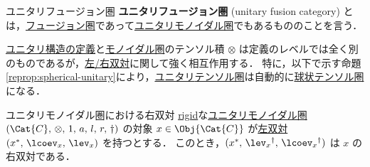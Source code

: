 \documentclass[TQFT_main]{subfiles}
\begin{document}



\begin{mydef}[label=def:UFC]{ユニタリフュージョン圏}
    \textbf{ユニタリフュージョン圏} (unitary fusion category) とは，\hyperref[def:tensorfusion-cat]{フュージョン圏}であって\hyperref[reredef:unitary-monoidal]{ユニタリモノイダル圏}でもあるもののことを言う．
\end{mydef}

\hyperref[redef:unitary]{ユニタリ構造の定義}と\hyperref[redef:monoidal-category]{モノイダル圏}のテンソル積 $\otimes$ は定義のレベルでは全く別のものであるが，\hyperref[redef:rigid]{左/右双対}に関して強く相互作用する．
特に，以下で示す命題\ref{reprop:spherical-unitary}により，\hyperref[reredef:unitary-monoidal]{ユニタリ}\hyperref[def:tensorfusion-cat]{テンソル圏}は自動的に\hyperref[def:spherical]{球状テンソル圏}になる．

\begin{mylem}[label=relem:rdual-unitary]{ユニタリモノイダル圏における右双対}
    \hyperref[redef:rigid]{rigid}な\hyperref[reredef:unitary-monoidal]{ユニタリモノイダル圏} $(\Cat{C},\, \otimes,\, 1,\, a,\, l,\, r,\, \dagger)$ の対象 $x \in \Obj{\Cat{C}}$ が\hyperref[def:dual]{左双対} $(x^*,\, \lcoev_x,\, \lev_x)$ を持つとする．
    このとき，$(x^*,\, \lev_x{}^\dagger,\, \lcoev_x{}^\dagger)$ は $x$ の右双対である．
\end{mylem}
\end{document}
